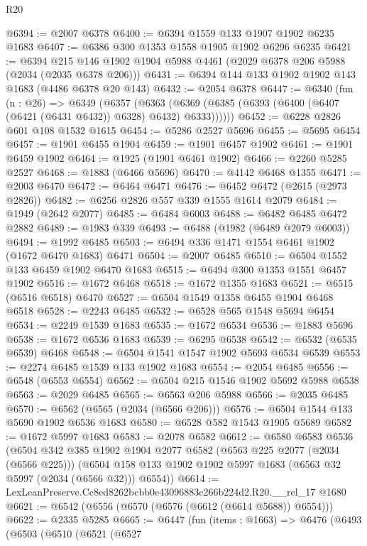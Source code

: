 \begin{lexlean}{R20}
\begin{coremodule}
@6394 := @2007 @6378
@6400 := @6394 @1559 @133 @1907 @1902 @6235 @1683
@6407 := @6386 @300 @1353 @1558 @1905 @1902 @6296 @6235
@6421 := @6394 @215 @146 @1902 @1904 @5988 @4461 (@2029 @6378 @206 @5988 (@2034 (@2035 @6378 @206)))
@6431 := @6394 @144 @133 @1902 @1902 @143 @1683 (@4486 @6378 @20 @143)
@6432 := @2054 @6378
@6447 := @6340
    (fun (n : @26) =>
    @6349
      (@6357
        (@6363 (@6369 (@6385 (@6393 (@6400 (@6407 (@6421 (@6431 @6432)) @6328) @6432) @6333))))))
@6452 := @6228 @2826 @601 @108 @1532 @1615
@6454 := @5286 @2527 @5696
@6455 := @5695 @6454
@6457 := @1901 @6455 @1904
@6459 := @1901 @6457 @1902
@6461 := @1901 @6459 @1902
@6464 := @1925 (@1901 @6461 @1902)
@6466 := @2260 @5285 @2527
@6468 := @1883 (@6466 @5696)
@6470 := @4142 @6468 @1355
@6471 := @2003 @6470
@6472 := @6464 @6471
@6476 := @6452 @6472 (@2615 (@2973 @2826))
@6482 := @6256 @2826 @557 @339 @1555 @1614 @2079
@6484 := @1949 (@2642 @2077)
@6485 := @6484 @6003
@6488 := @6482 @6485 @6472 @2882
@6489 := @1983 @339
@6493 := @6488 (@1982 (@6489 @2079 @6003))
@6494 := @1992 @6485
@6503 := @6494 @336 @1471 @1554 @6461 @1902 (@1672 @6470 @1683) @6471
@6504 := @2007 @6485
@6510 := @6504 @1552 @133 @6459 @1902 @6470 @1683
@6515 := @6494 @300 @1353 @1551 @6457 @1902
@6516 := @1672 @6468
@6518 := @1672 @1355 @1683
@6521 := @6515 (@6516 @6518) @6470
@6527 := @6504 @1549 @1358 @6455 @1904 @6468 @6518
@6528 := @2243 @6485
@6532 := @6528 @565 @1548 @5694 @6454
@6534 := @2249 @1539 @1683
@6535 := @1672 @6534
@6536 := @1883 @5696
@6538 := @1672 @6536 @1683
@6539 := @6295 @6538
@6542 := @6532 (@6535 @6539) @6468
@6548 := @6504 @1541 @1547 @1902 @5693 @6534 @6539
@6553 := @2274 @6485 @1539 @133 @1902 @1683
@6554 := @2054 @6485
@6556 := @6548 (@6553 @6554)
@6562 := @6504 @215 @1546 @1902 @5692 @5988 @6538
@6563 := @2029 @6485
@6565 := @6563 @206 @5988
@6566 := @2035 @6485
@6570 := @6562 (@6565 (@2034 (@6566 @206)))
@6576 := @6504 @1544 @133 @5690 @1902 @6536 @1683
@6580 := @6528 @582 @1543 @1905 @5689
@6582 := @1672 @5997 @1683
@6583 := @2078 @6582
@6612 := @6580
    @6583
    @6536
    (@6504
      @342
      @385
      @1902
      @1904
      @2077
      @6582
      (@6563 @225 @2077 (@2034 (@6566 @225)))
      (@6504 @158 @133 @1902 @1902 @5997 @1683 (@6563 @32 @5997 (@2034 (@6566 @32))) @6554))
@6614 := LexLeanPreserve.Cc8ed8262bcbb0e43096883c266b224d2.R20.__rel_17 @1680
@6621 := @6542 (@6556 (@6570 (@6576 (@6612 (@6614 @5688)) @6554)))
@6622 := @2335 @5285
@6665 := @6447
    (fun (items : @1663) =>
    @6476
      (@6493
        (@6503
          (@6510
            (@6521
              (@6527

\end{coremodule}
\end{lexlean}
